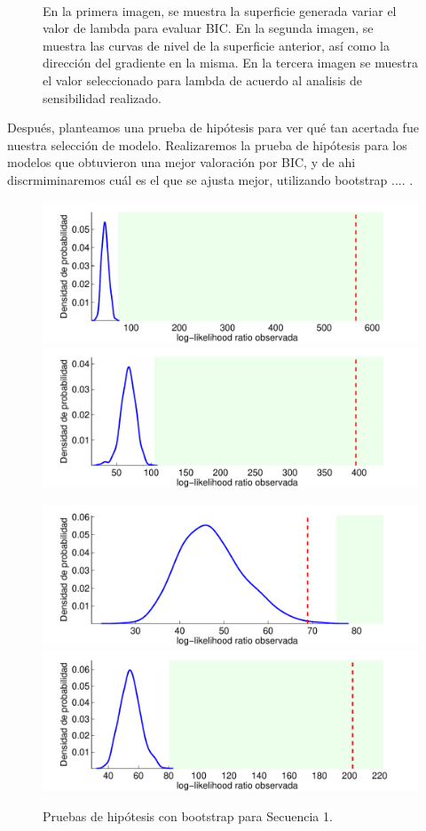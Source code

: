 \begin{figure}[H]
\begin{center}
\begin{subfigure}[b]{0.4\textwidth}
    \caption{}
  \end{subfigure}
  \end{center}
  \caption*{\\ En la primera imagen, se muestra la superficie generada variar el valor de lambda para evaluar BIC. En la segunda imagen, se muestra las curvas de nivel de la superficie anterior, así como la dirección del gradiente en la misma. En la tercera imagen se muestra el valor seleccionado para lambda de acuerdo al analisis de sensibilidad realizado.}
  \label{fig:prb1_sup}
\end{figure}

Después, planteamos una prueba de hipótesis para ver qué tan acertada fue nuestra selección de modelo. Realizaremos la prueba de hipótesis para los modelos que obtuvieron una mejor valoración por BIC, y de ahi discrmiminaremos cuál es el que se ajusta mejor, utilizando bootstrap .... .

\begin{figure}[H]
  \centerline  
  {\includegraphics[width=0.6\linewidth]{gfx/chap6/cuervoboot1}
   \includegraphics[width=0.6\linewidth]{gfx/chap6/cuervoboot2} }
  \centerline  
  {\includegraphics[width=0.6\linewidth]{gfx/chap6/cuervoboot3}
   \includegraphics[width=0.6\linewidth]{gfx/chap6/cuervoboot4}
  } \quad
  \caption{Pruebas de hipótesis con bootstrap para Secuencia 1.}
  \label{fig:prb1_boot}
\end{figure}

